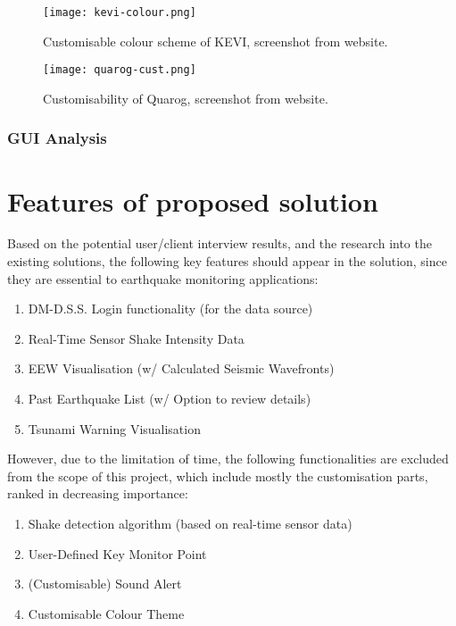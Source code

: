 \begin{figure}[!ht]
    \centering

    \texttt{[image: kevi-colour.png]}
    \caption[Customisable colour scheme of KEVI]{Customisable colour scheme of KEVI, screenshot from website.}
    \label{fig:kevi-colour-cust}
\end{figure}

\begin{figure}[!ht]
    \centering

    \texttt{[image: quarog-cust.png]}
    \caption[Customisability of Quarog]{Customisability of Quarog, screenshot from website.}
    \label{fig:quarog-cust}
\end{figure}

\subsubsection{GUI Analysis}



\section{Features of proposed solution}

Based on the potential user/client interview results, and the research into the existing solutions, the following key features should appear in the solution, since they are essential to earthquake monitoring applications:
\begin{enumerate}
    \item DM-D.S.S. Login functionality (for the data source)
    \item Real-Time Sensor Shake Intensity Data
    \item EEW Visualisation (w/ Calculated Seismic Wavefronts)
    \item Past Earthquake List (w/ Option to review details)
    \item Tsunami Warning Visualisation
\end{enumerate}

However, due to the limitation of time, the following functionalities are excluded from the scope of this project, which include mostly the customisation parts, ranked in decreasing importance:
\begin{enumerate}
    \item Shake detection algorithm (based on real-time sensor data)
    \item User-Defined Key Monitor Point
    \item (Customisable) Sound Alert
    \item Customisable Colour Theme
\end{enumerate}

